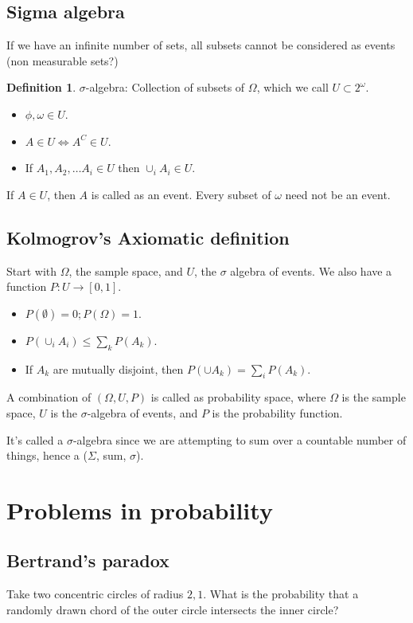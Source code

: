 \documentclass{book}
\theoremstyle{definition}
\newtheorem{definition}[theorem]{Definition}
\begin{document}
\section{Sigma algebra}

If we have an infinite number of sets, all subsets cannot be considered as events
(non measurable sets?)

\begin{definition}
$\sigma$-algebra: Collection of subsets of $\Omega$, which we call $U \subset 2^{\omega}$.
\begin{itemize}
\item $\phi, \omega \in U$.
\item $A \in U \iff A^C \in U$.
\item If $A_1, A_2, \dots A_i \in U$ then $\cup_i A_i \in U$.
\end{itemize}
\end{definition}

If $A \in U$, then $A$ is called as an event. Every subset of $\omega$ need not
be an event.

\section{ Kolmogrov's Axiomatic definition}

Start with $\Omega$, the sample space, and $U$, the $\sigma$ algebra of events.
We also have a function $P: U \rightarrow [0, 1]$.

\begin{itemize}
\item $P(\emptyset) = 0; P(\Omega) = 1$.
\item $P(\cup_i A_i) \leq \sum_k P(A_k)$.
\item If $A_k$ are mutually disjoint, then $P(\cup A_k) = \sum_i P(A_k)$.
\end{itemize}

A combination of $(\Omega, U, P)$ is called as probability space, where $\Omega$
is the sample space, $U$ is the $\sigma$-algebra of events, and $P$ is the
probability function.

It's called a $\sigma$-algebra since we are attempting to sum over a countable
number of things, hence a ($\Sigma$, sum, $\sigma$).

\chapter{Problems in probability}
\section{Bertrand's paradox}
Take two concentric circles of radius $2, 1$. What is the probability that
a randomly drawn chord of the outer circle intersects the inner circle?
\end{document}
